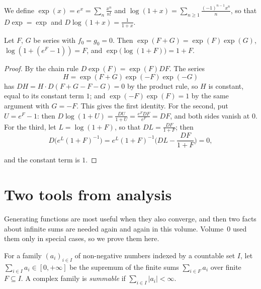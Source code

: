 We define $\exp(x)=e^x=\sum_n\frac{x^n}{n!}$ and $\log(1+x)=\sum_{n\ge1}\frac{(-1)^{n-1}x^n}n$, so that $D\exp=\exp$ and
$D\log(1+x)=\frac1{1+x}$.

\begin{proposition}\label{prop:explog}
Let $F$, $G$ be series with $f_0=g_0=0$. Then $\exp(F+G)=\exp(F)\exp(G)$, $\log(1+(e^F-1))=F$, and
$\exp\bigl(\log(1+F)\bigr)=1+F$.
\end{proposition}
\begin{proof}
By the chain rule $D\exp(F)=\exp(F)DF$. The series
\[
H=\exp(F+G)\exp(-F)\exp(-G)
\]
 has
$DH=H\cdot D(F+G-F-G)=0$ by the product rule, so $H$ is constant, equal to its constant term $1$; and
$\exp(-F)\exp(F)=1$ by the same argument with $G=-F$. This gives the first identity. For the second, put
$U=e^F-1$: then $D\log(1+U)=\frac{DU}{1+U}=\frac{e^FDF}{e^F}=DF$, and both sides vanish at $0$. For the third, let
$L=\log(1+F)$, so that $DL=\frac{DF}{1+F}$; then
\[
D\bigl(e^L(1+F)^{-1}\bigr)=e^L(1+F)^{-1}\bigl(DL-\frac{DF}{1+F}\bigr)=0,
\]

and the constant term is $1$.
\end{proof}

\section{Two tools from analysis}

Generating functions are most useful when they also converge, and then two facts about infinite sums are needed again
and again in this volume. Volume~0 used them only in special cases, so we prove them here.

For a family $(a_i)_{i\in I}$ of non-negative numbers indexed by a countable set $I$, let $\sum_{i\in I}a_i\in[0,+\infty]$ be the
supremum of the finite sums $\sum_{i\in F}a_i$ over finite $F\subseteq I$. A complex family is \emph{summable} if
$\sum_{i\in I}|a_i|<\infty$.

